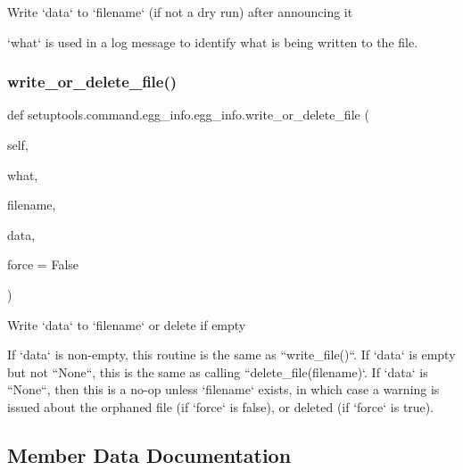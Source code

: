 \begin{DoxyVerb}Write `data` to `filename` (if not a dry run) after announcing it

`what` is used in a log message to identify what is being written
to the file.
\end{DoxyVerb}
 \mbox{\label{classsetuptools_1_1command_1_1egg__info_1_1egg__info_af70ce31ed5b38118ad41b3899f56f9b8}} 
\subsubsection{\texorpdfstring{write\+\_\+or\+\_\+delete\+\_\+file()}{write\_or\_delete\_file()}}
{\footnotesize\ttfamily def setuptools.\+command.\+egg\+\_\+info.\+egg\+\_\+info.\+write\+\_\+or\+\_\+delete\+\_\+file (\begin{DoxyParamCaption}\item[{}]{self,  }\item[{}]{what,  }\item[{}]{filename,  }\item[{}]{data,  }\item[{}]{force = {\ttfamily False} }\end{DoxyParamCaption})}

\begin{DoxyVerb}Write `data` to `filename` or delete if empty

If `data` is non-empty, this routine is the same as ``write_file()``.
If `data` is empty but not ``None``, this is the same as calling
``delete_file(filename)`.  If `data` is ``None``, then this is a no-op
unless `filename` exists, in which case a warning is issued about the
orphaned file (if `force` is false), or deleted (if `force` is true).
\end{DoxyVerb}
 

\subsection{Member Data Documentation}
\mbox{\label{classsetuptools_1_1command_1_1egg__info_1_1egg__info_a943f2c2d1031c21852c19ed7e1a2c4d3}} 
